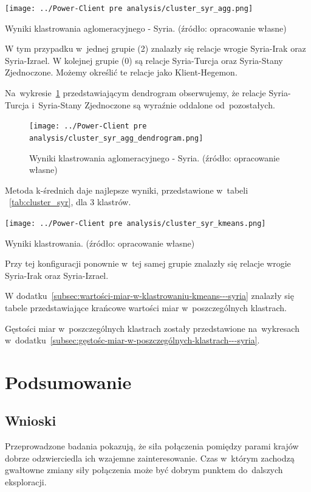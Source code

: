 \documentclass[11pt]{report}
\begin{document}
    \begin{table}[tp]
        \centering
        \texttt{[image: ../Power-Client pre analysis/cluster\_syr\_agg.png]}
        \caption{Wyniki klastrowania aglomeracyjnego - Syria. (źródło: opracowanie własne)}
        \label{tab:cluster_syr_agg}
    \end{table}

    W tym przypadku w~jednej grupie (2) znalazły się relacje wrogie Syria-Irak oraz Syria-Izrael.
    W kolejnej grupie (0) są relacje Syria-Turcja oraz Syria-Stany Zjednoczone.
    Możemy określić te relacje jako Klient-Hegemon.


    Na~wykresie~\ref{fig:cluster_syr_agg_dendrogram} przedstawiającym dendrogram obserwujemy, że relacje
    Syria-Turcja i~Syria-Stany Zjednoczone są wyraźnie oddalone od~pozostałych.

    \begin{figure}[tp]
        \centering
        \texttt{[image: ../Power-Client pre analysis/cluster\_syr\_agg\_dendrogram.png]}
        \caption{Wyniki klastrowania aglomeracyjnego - Syria. (źródło: opracowanie własne)}
        \label{fig:cluster_syr_agg_dendrogram}
    \end{figure}

    Metoda k-średnich daje najlepsze wyniki, przedstawione w~tabeli ~\ref{tab:cluster_syr}, dla 3 klastrów.

    \begin{table}[tp]
        \centering
        \texttt{[image: ../Power-Client pre analysis/cluster\_syr\_kmeans.png]}
        \caption{Wyniki klastrowania. (źródło: opracowanie własne)}
        \label{tab:cluster_syr}
    \end{table}

    Przy tej konfiguracji ponownie w~tej samej grupie znalazły się relacje wrogie Syria-Irak oraz Syria-Izrael.

    W dodatku~\ref{subsec:wartości-miar-w-klastrowaniu-kmeans---syria} znalazły się tabele przedstawiające krańcowe wartości miar w~poszczególnych klastrach.

    Gęstości miar w~poszczególnych klastrach zostały przedstawione na~wykresach w~dodatku~\ref{subsec:gęstośc-miar-w-poszczególnych-klastrach---syria}.


    \chapter{Podsumowanie}\label{ch:podsumowanie}


    \section{Wnioski}\label{sec:wnioski}
    Przeprowadzone badania pokazują, że siła połączenia pomiędzy parami krajów dobrze odzwierciedla ich wzajemne zainteresowanie.
    Czas w~którym zachodzą gwałtowne zmiany siły połączenia może być dobrym punktem do~dalszych eksploracji.
\end{document}
